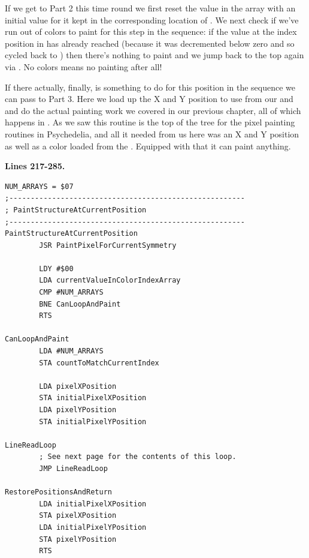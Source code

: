 If we get to Part 2 this time round we first reset the value in the  array with an initial value for it kept in the corresponding
location of . We next check if we've run out of colors to paint for this step
in the sequence: if the value at the index position in  has already reached  (because
it was decremented below zero and so cycled back to ) then there's nothing to paint and we jump back to the top
again via . No colors means no painting after all!

If there actually, finally, is something to do for this position in the sequence we can pass to Part 3. Here we load up the X and Y
position to use from our  and  and do the actual painting work we covered
in our previous chapter, all of which happens in . As we saw this routine is the top of the
tree for the pixel painting routines in Psychedelia, and all it needed from us here was an X and Y position as well as a color
loaded from the . Equipped with that it can paint anything. 

\clearpage
\textbf{Lines 217-285. }
\begin{lstlisting}[caption = The routine responsible for orchestrating the pattern painting.]
NUM_ARRAYS = $07
;-------------------------------------------------------
; PaintStructureAtCurrentPosition
;-------------------------------------------------------
PaintStructureAtCurrentPosition   
        JSR PaintPixelForCurrentSymmetry

        LDY #$00
        LDA currentValueInColorIndexArray
        CMP #NUM_ARRAYS
        BNE CanLoopAndPaint
        RTS 

CanLoopAndPaint   
        LDA #NUM_ARRAYS
        STA countToMatchCurrentIndex
       
        LDA pixelXPosition
        STA initialPixelXPosition
        LDA pixelYPosition
        STA initialPixelYPosition

LineReadLoop   
        ; See next page for the contents of this loop.
        JMP LineReadLoop

RestorePositionsAndReturn   
        LDA initialPixelXPosition
        STA pixelXPosition
        LDA initialPixelYPosition
        STA pixelYPosition
        RTS 

\end{lstlisting}
\clearpage

